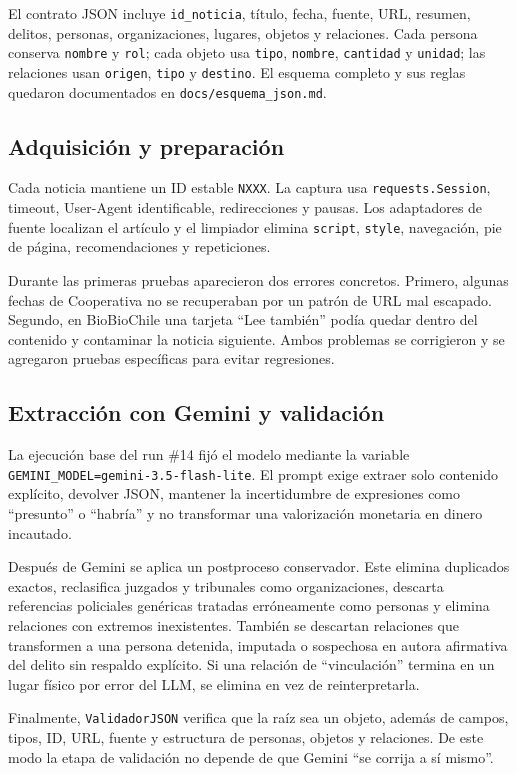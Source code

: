 \documentclass[conference]{IEEEtran}
\begin{document}
El contrato JSON incluye \texttt{id\_noticia}, título, fecha, fuente, URL, resumen, delitos, personas, organizaciones, lugares, objetos y relaciones. Cada persona conserva \texttt{nombre} y \texttt{rol}; cada objeto usa \texttt{tipo}, \texttt{nombre}, \texttt{cantidad} y \texttt{unidad}; las relaciones usan \texttt{origen}, \texttt{tipo} y \texttt{destino}. El esquema completo y sus reglas quedaron documentados en \texttt{docs/esquema\_json.md}.

\subsection{Adquisición y preparación}
Cada noticia mantiene un ID estable \texttt{NXXX}. La captura usa \texttt{requests.Session}, timeout, User-Agent identificable, redirecciones y pausas. Los adaptadores de fuente localizan el artículo y el limpiador elimina \texttt{script}, \texttt{style}, navegación, pie de página, recomendaciones y repeticiones.

Durante las primeras pruebas aparecieron dos errores concretos. Primero, algunas fechas de Cooperativa no se recuperaban por un patrón de URL mal escapado. Segundo, en BioBioChile una tarjeta ``Lee también'' podía quedar dentro del contenido y contaminar la noticia siguiente. Ambos problemas se corrigieron y se agregaron pruebas específicas para evitar regresiones.

\subsection{Extracción con Gemini y validación}
La ejecución base del run \#14 fijó el modelo mediante la variable \texttt{GEMINI\_MODEL=gemini-3.5-flash-lite}. El prompt exige extraer solo contenido explícito, devolver JSON, mantener la incertidumbre de expresiones como ``presunto'' o ``habría'' y no transformar una valorización monetaria en dinero incautado.

Después de Gemini se aplica un postproceso conservador. Este elimina duplicados exactos, reclasifica juzgados y tribunales como organizaciones, descarta referencias policiales genéricas tratadas erróneamente como personas y elimina relaciones con extremos inexistentes. También se descartan relaciones que transformen a una persona detenida, imputada o sospechosa en autora afirmativa del delito sin respaldo explícito. Si una relación de ``vinculación'' termina en un lugar físico por error del LLM, se elimina en vez de reinterpretarla.

Finalmente, \texttt{ValidadorJSON} verifica que la raíz sea un objeto, además de campos, tipos, ID, URL, fuente y estructura de personas, objetos y relaciones. De este modo la etapa de validación no depende de que Gemini ``se corrija a sí mismo''.
\end{document}

